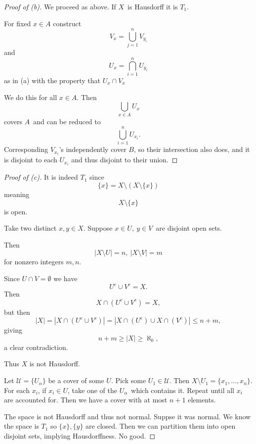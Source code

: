 \documentclass[11pt]{article}
\begin{document}
\begin{proof}[Proof of (b)]
    We proceed as above. 
    If $X$ is Hausdorff it is $T_1$. 

    For fixed $x \in A$ construct 
    \[
        V_x = \bigcup_{j=1}^n V_{y_i}
    \]
    and 
    \[
        U_x = \bigcap_{i=1}^n U_{y_i}
    \]
    as in (a) with the property that $U_x \cap V_x$ 

    We do this for all $x \in A$.  
    Then 
    \[
        \bigcup_{x\in A} U_x
    \]
    covers $A$ and can be reduced to 
    \[
        \bigcup_{i=1}^n U_{x_i}. 
    \]
    Corresponding $V_{x_i}$'s independently cover $B$, 
    so their intersection also does, and it is disjoint to 
    each $U_{x_i}$ and thus disjoint to their union. 

\end{proof}
\begin{proof}[Proof of (c)]
    It is indeed $T_1$ since 
    \[
        \{x\} = X \setminus (X \setminus \{x\})
    \]
    meaning
    \[
        X \setminus \{x\}
    \]
    is open. 
    
    Take two distinct $x,y \in X$. 
    Suppose $x \in U, \ y \in V$ are disjoint open sets. 

    Then 
    \[
        |X \setminus U| = n, \ |X \setminus V| = m 
    \]
    for nonzero integers $m,n$.

    Since $U \cap V =\emptyset$ we have 
    \[
        U^c \cup V^c = X. 
    \]
    Then 
    \[
        X \cap (U^c \cup V^c) = X, 
    \]
    but then 
    \[
        |X| = |X \cap (U^c \cup V^c)| 
        = |X \cap (U^c) \cup X \cap (V^c)| 
        \leq n + m, 
    \]
    giving 
    \[
        n+m \geq |X| \geq \aleph_0, 
    \]
    a clear contradiction.

    Thus $X$ is not Hausdorff. 

    Let $\mathcal U = \{U_\alpha\}$ be a cover of some 
    $U$. 
    Pick some $U_1 \in \mathcal U$. 
    Then $X \setminus U_1 = \{x_1,\ldots,x_n\}$. 
    For each $x_i$, if $x_i \in U$, take one of the 
    $U_\alpha$ which contains it. Repeat until all $x_i$ 
    are accounted for. Then we have a cover with at most 
    $n + 1$ elements. 

    The space is not Hausdorff and thus not normal. 
    Suppse it was normal. We know the space is $T_1$ so 
    $\{x\}, \{y\}$ are closed. Then we can partition them into 
    open disjoint sets, implying Hausdorffness. No good. 
\end{proof}
\end{document}
